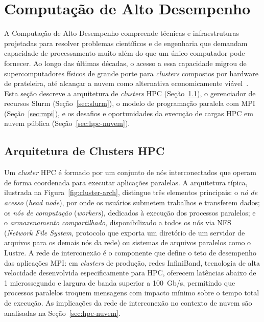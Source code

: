 \section{Computação de Alto Desempenho}
\label{sec:hpc}

A Computação de Alto Desempenho compreende técnicas e infraestruturas projetadas
para resolver problemas científicos e de engenharia que demandam capacidade de
processamento muito além do que um único computador pode fornecer. Ao longo das
últimas décadas, o acesso a essa capacidade migrou de supercomputadores físicos de
grande porte para \textit{clusters} compostos por hardware de prateleira, até
alcançar a nuvem como alternativa economicamente viável~\cite{netto2018hpccloud}.
Esta seção descreve a arquitetura de \textit{clusters} HPC
(Seção~\ref{sec:hpc-clusters}), o gerenciador de recursos Slurm
(Seção~\ref{sec:slurm}), o modelo de programação paralela com MPI
(Seção~\ref{sec:mpi}), e os desafios e oportunidades da execução de cargas HPC em
nuvem pública (Seção~\ref{sec:hpc-nuvem}).

\subsection{Arquitetura de Clusters HPC}
\label{sec:hpc-clusters}

Um \textit{cluster} HPC é formado por um conjunto de nós interconectados que
operam de forma coordenada para executar aplicações paralelas. A arquitetura
típica, ilustrada na Figura~\ref{fig:cluster-arch}, distingue três elementos
principais: o \textit{nó de acesso} (\textit{head node}), por onde os usuários
submetem trabalhos e transferem dados; os \textit{nós de computação}
(\textit{workers}), dedicados à execução dos processos paralelos; e o
\textit{armazenamento compartilhado}, disponibilizado a todos os nós via NFS
(\textit{Network File System}, protocolo que exporta um diretório de um servidor
de arquivos para os demais nós da rede) ou sistemas de arquivos paralelos como o
Lustre. A rede de interconexão é o componente que define o teto de desempenho das
aplicações MPI: em \textit{clusters} de produção, redes InfiniBand, tecnologia de
alta velocidade desenvolvida especificamente para HPC, oferecem latências abaixo
de 1 microssegundo e largura de banda superior a 100~Gb/s, permitindo que processos
paralelos troquem mensagens com impacto mínimo sobre o tempo total de execução. As
implicações da rede de interconexão no contexto de nuvem são analisadas na
Seção~\ref{sec:hpc-nuvem}.

